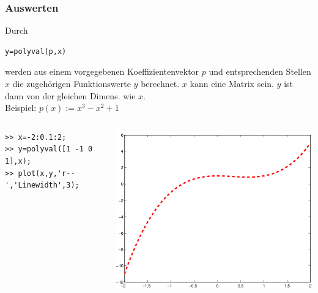 \begin{frame}[fragile]\frametitle{Auswerten}
Durch 
\begin{lstlisting}
y=polyval(p,x)
\end{lstlisting}
werden aus einem vorgegebenen Koeffizientenvektor $p$ und
entsprechenden Stellen $x$ die zugeh\"origen Funktionswerte $y$
berechnet. $x$ kann eine Matrix sein. $y$ ist dann von der gleichen
Dimens. wie $x$.\\[0.2cm]

\alert{Beispiel:} $p(x):= x^3 - x^2 +1$\\
\begin{columns}[c]
\begin{lstlisting}
>> x=-2:0.1:2; 
>> y=polyval([1 -1 0 1],x); 
>> plot(x,y,'r--','Linewidth',3);
\end{lstlisting}
\includegraphics[width=\textwidth]{./figures/polynom1}
\end{columns}
\end{frame}
%
%
